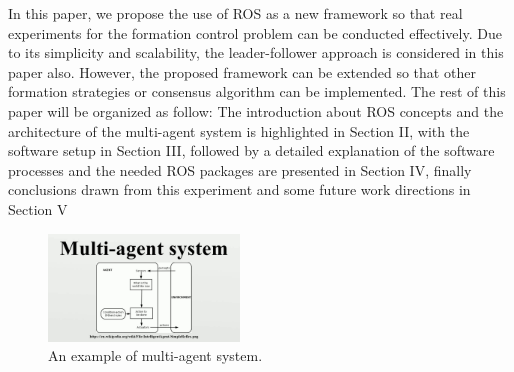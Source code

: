 \documentclass[journal]{IEEEtran}
\begin{document}
In this paper, we propose the use of ROS as a new framework so that real experiments for the formation control problem can be conducted effectively. Due to its simplicity and scalability, the leader-follower approach is considered in this paper also. However, the proposed framework can be extended so that other formation strategies or consensus algorithm can be implemented. 
The rest of this paper will be organized as follow: The introduction about ROS concepts and the architecture of the multi-agent system is highlighted in Section II, with the software setup in Section III, followed by a detailed explanation of the software processes and the needed ROS packages are presented  in Section IV, finally conclusions drawn from this experiment and some future work directions in Section V



\begin{figure}[!h]
\begin{center}
\includegraphics[width=2in]{one.jpg}
\caption{An example of multi-agent system.}
\end{center}
\label{fig:mypicture1}
\end{figure}


\end{document}
